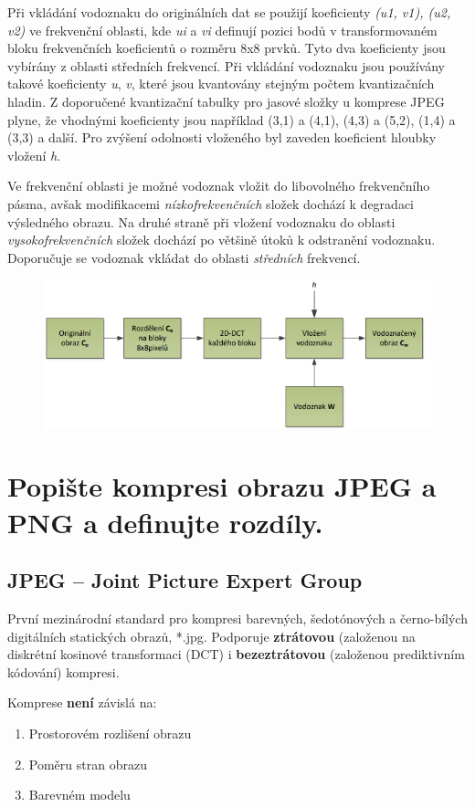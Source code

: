 Při vkládání vodoznaku do originálních dat se použijí koeficienty \textit{(u1, v1), (u2, v2)} ve frekvenční oblasti, kde \textit{ui} a \textit{vi} definují pozici bodů v transformovaném bloku frekvenčních koeficientů o rozměru 8x8 prvků. Tyto dva koeficienty jsou vybírány z oblasti středních frekvencí. Při vkládání vodoznaku jsou používány takové koeficienty \textit{u}, \textit{v}, které jsou kvantovány stejným počtem kvantizačních hladin. Z doporučené kvantizační tabulky pro jasové složky u komprese JPEG plyne, že vhodnými koeficienty jsou například (3,1) a (4,1), (4,3) a (5,2), (1,4) a (3,3) a další. Pro zvýšení odolnosti vloženého byl zaveden koeficient hloubky vložení \textit{h}.

Ve frekvenční oblasti je možné vodoznak vložit do libovolného frekvenčního pásma, avšak modifikacemi \textit{nízkofrekvenčních} složek dochází k degradaci výsledného obrazu. Na druhé straně při vložení vodoznaku do oblasti \textit{vysokofrekvenčních} složek dochází po většině útoků k odstranění vodoznaku. Doporučuje se vodoznak vkládat do oblasti \textit{středních} frekvencí.

\begin{figure}[ht]
    \centering
    \includegraphics[width=0.65\linewidth]{MPC-ZMD//images/ffff.png}
\end{figure}
\FloatBarrier

\section{Popište kompresi obrazu JPEG a PNG a definujte rozdíly.}

\subsection{JPEG -- Joint Picture Expert Group}
První mezinárodní standard pro kompresi barevných, šedotónových a černo-bílých
digitálních statických obrazů, *.jpg. Podporuje \textbf{ztrátovou} (založenou na diskrétní kosinové transformaci (DCT) i \textbf{bezeztrátovou}
(založenou prediktivním kódování) kompresi.

Komprese \textbf{není} závislá na: \vspace{-4mm}
\begin{enumerate}
    \item Prostorovém rozlišení obrazu
    \item Poměru stran obrazu
    \item Barevném modelu
\end{enumerate}

